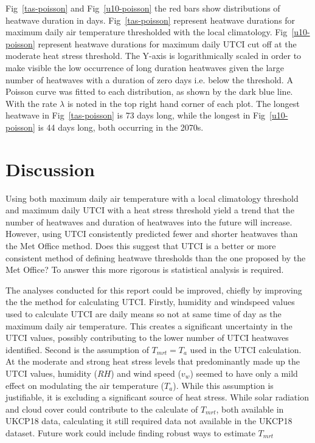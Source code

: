 \documentclass[10pt,letterpaper]{article}
\begin{document}
Fig~\ref{tas-poisson} and Fig~\ref{u10-poisson} the red bars show distributions of heatwave duration in days.
Fig~\ref{tas-poisson} represent heatwave durations for maximum daily air temperature thresholded with the local climatology.
Fig~\ref{u10-poisson} represent heatwave durations for maximum daily UTCI cut off at the moderate heat stress threshold.
The Y-axis is logarithmically scaled in order to make visible the low occurrence of long duration heatwaves given the large number of heatwaves with a duration of zero days i.e. below the threshold.
A Poisson curve was fitted to each distribution, as shown by the dark blue line.
With the rate $\lambda$ is noted in the top right hand corner of each plot.
The longest heatwave in Fig~\ref{tas-poisson} is 73 days long, while the longest in Fig~\ref{u10-poisson} is 44 days long, both occurring in the 2070s.



\section*{Discussion}

Using both maximum daily air temperature with a local climatology threshold and maximum daily UTCI with a heat stress threshold yield a trend that the number of heatwaves and duration of heatwaves into the future will increase. 
However, using UTCI consistently predicted fewer and shorter heatwaves than the Met Office method. Does this suggest that UTCI is a better or more consistent method of defining heatwave thresholds than the one proposed by the Met Office? To answer this more rigorous is statistical analysis is required.

The analyses conducted for this report could be improved, chiefly by improving the the method for calculating UTCI.
Firstly, humidity and windspeed values used to calculate UTCI are daily means so not at same time of day as the maximum daily air temperature.
This creates a significant uncertainty in the UTCI values, possibly contributing to the lower number of UTCI heatwaves identified.
Second is the assumption of $T_{mrt}=T_a$ used in the UTCI calculation.
At the moderate and strong heat stress levels that predominantly made up the UTCI values, humidity ($RH$) and wind speed ($v_w$) seemed to have only a mild effect on modulating the air temperature ($T_a$).
While this assumption is justifiable, it is excluding a significant source of heat stress.
While solar radiation and cloud cover could contribute to the calculate of $T_{mrt}$, both available in UKCP18 data, calculating it still required data not available in the UKCP18 dataset.\cite{Weihs2018}
Future work could include finding robust ways to estimate $T_{mrt}$
\end{document}
